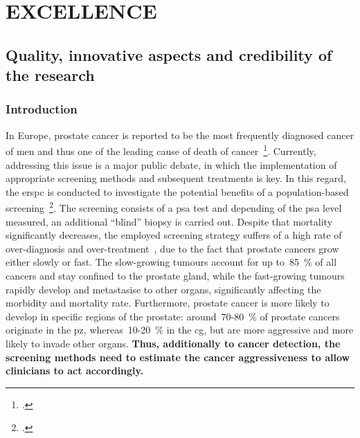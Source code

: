 \section{EXCELLENCE}
\label{sec:excellence}

\subsection{Quality, innovative aspects and credibility of the research}
\label{sec:quality}

\subsubsection{Introduction}
\label{sec:introduction}

In Europe, prostate cancer is reported to be the most frequently diagnosed cancer of men and thus one of the leading cause of death of cancer~\footcite{Ferlay2013}. 
Currently, addressing this issue is a major public debate, in which the implementation of appropriate screening methods and subsequent treatments is key.
In this regard, the \ac{erspc} is conducted to investigate the potential benefits of a population-based screening~\footcite{Schroder2015}. 
The screening consists of a \ac{psa} test and depending of the \ac{psa} level measured, an additional ``blind'' biopsy is carried out. 
Despite that mortality significantly decreases, the employed screening strategy suffers of a high rate of over-diagnosis and over-treatment~\cite{Delpierre2013,Schroder2015}, due to the fact that prostate cancers grow either slowly or fast.
The slow-growing tumours account for up to~85~\% of all cancers and stay confined to the prostate gland, while the fast-growing tumours rapidly develop and metastasise to other organs, significantly affecting the morbidity and mortality rate.
Furthermore, prostate cancer is more likely to develop in specific regions of the prostate: around~70-80~\% of prostate cancers originate in the \ac{pz}, whereas~10-20~\% in the \ac{cg}, but are more aggressive and more likely to invade other organs. 
\textbf{Thus, additionally to cancer detection, the screening methods need to estimate the cancer aggressiveness to allow clinicians to act accordingly.}

